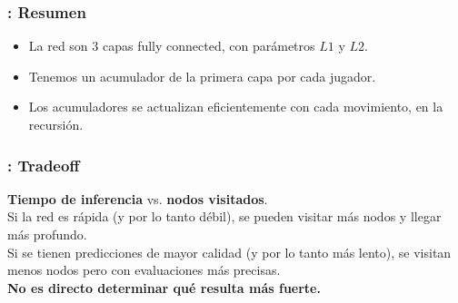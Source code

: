 \begin{frame}
\frametitle{: Resumen}
\begin{itemize}
\item<1-> La red son 3 capas fully connected, con parámetros $L1$ y $L2$.
\item<2-> Tenemos un acumulador de la primera capa por cada jugador.
\item<3-> Los acumuladores se actualizan eficientemente con cada movimiento, en la recursión.
\end{itemize}
\end{frame}

\begin{frame}
\frametitle{: Tradeoff}
\textbf{Tiempo de inferencia} vs. \textbf{nodos visitados}. \\
\vspace{1em}
\pause
Si la red es rápida (y por lo tanto débil), se pueden visitar más nodos y llegar más profundo. \\
\pause
Si se tienen predicciones de mayor calidad (y por lo tanto más lento), se visitan menos nodos pero con evaluaciones más precisas. \\
\pause
\vspace{1em}
\textbf{No es directo determinar qué resulta más fuerte.}
\end{frame}
